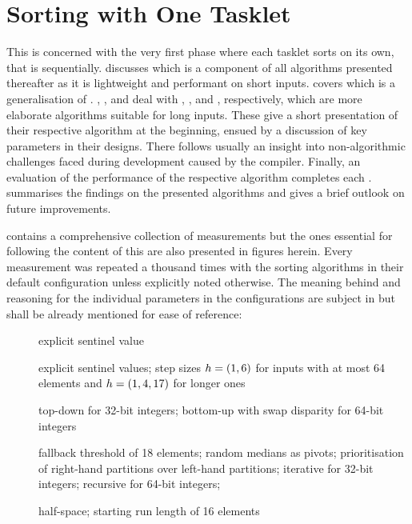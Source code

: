 \chapter{Sorting with One Tasklet}
\label{sec:tasklet}

This  is concerned with the very first phase where each tasklet sorts on its own, that is sequentially.
 discusses \IS{} which is a component of all algorithms presented thereafter as it is lightweight and performant on short inputs.
 covers \ShS{} which is a generalisation of \IS{}.
\hyperref[sec:tasklet:heap]{ }, , and  deal with \HS{}, \QS{}, and \MS{}, respectively, which are more elaborate algorithms suitable for long inputs.
These  give a short presentation of their respective algorithm at the beginning, ensued by a discussion of key parameters in their designs.
There follows usually an insight into non-algorithmic challenges faced during development caused by the compiler.
Finally, an evaluation of the performance of the respective algorithm completes each .
 summarises the findings on the presented algorithms and gives a brief outlook on future improvements.

 contains a comprehensive collection of measurements but the ones essential for following the content of this  are also presented in figures herein.
Every measurement was repeated a thousand times with the sorting algorithms in their default configuration unless explicitly noted otherwise.
The meaning behind and reasoning for the individual parameters in the configurations are subject in  but shall be already mentioned for ease of reference:
\begin{description}
	\item[\IS{}]
	explicit sentinel value

	\item[\ShS{}]
	explicit sentinel values;
	step sizes \(h = (1, 6)\) for inputs with at most 64 elements and \(h = (1, 4, 17)\) for longer ones

	\item[\HS{}]
	top-down for 32-bit integers;
	bottom-up with swap disparity for 64-bit integers

	\item[\QS{}]
	fallback threshold of 18 elements;
	random medians as pivots;
	prioritisation of right-hand partitions over left-hand partitions;
	iterative for 32-bit integers;
	recursive for 64-bit integers;

	\item[\MS{}]
	half-space;
	starting run length of 16 elements
\end{description}

\clearpage


\clearpage


\clearpage


\clearpage


\clearpage


\clearpage

